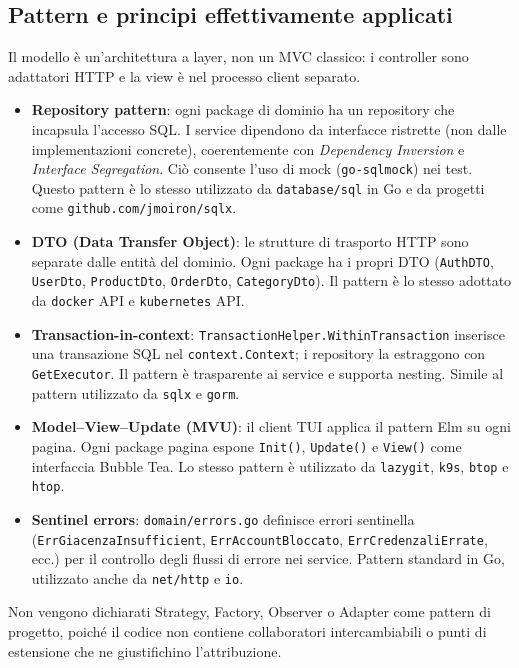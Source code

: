 \documentclass[a4paper,12pt]{article}
\begin{document}
\subsection{Pattern e principi effettivamente applicati}

Il modello è un'architettura a layer, non un MVC classico: i controller sono adattatori HTTP e la view è nel processo client separato.

\begin{itemize}
    \item \textbf{Repository pattern}: ogni package di dominio ha un repository che incapsula l'accesso SQL. I service dipendono da interfacce ristrette (non dalle implementazioni concrete), coerentemente con \emph{Dependency Inversion} e \emph{Interface Segregation}. Ciò consente l'uso di mock (\texttt{go-sqlmock}) nei test. Questo pattern è lo stesso utilizzato da \texttt{database/sql} in Go e da progetti come \texttt{github.com/jmoiron/sqlx}.
    \item \textbf{DTO (Data Transfer Object)}: le strutture di trasporto HTTP sono separate dalle entità del dominio. Ogni package ha i propri DTO (\texttt{AuthDTO}, \texttt{UserDto}, \texttt{ProductDto}, \texttt{OrderDto}, \texttt{CategoryDto}). Il pattern è lo stesso adottato da \texttt{docker} API e \texttt{kubernetes} API.
    \item \textbf{Transaction-in-context}: \texttt{TransactionHelper.WithinTransaction} inserisce una transazione SQL nel \texttt{context.Context}; i repository la estraggono con \texttt{GetExecutor}. Il pattern è trasparente ai service e supporta nesting. Simile al pattern utilizzato da \texttt{sqlx} e \texttt{gorm}.
    \item \textbf{Model--View--Update (MVU)}: il client TUI applica il pattern Elm su ogni pagina. Ogni package pagina espone \texttt{Init()}, \texttt{Update()} e \texttt{View()} come interfaccia Bubble Tea. Lo stesso pattern è utilizzato da \texttt{lazygit}, \texttt{k9s}, \texttt{btop} e \texttt{htop}.
    \item \textbf{Sentinel errors}: \texttt{domain/errors.go} definisce errori sentinella (\texttt{ErrGiacenzaInsufficient}, \texttt{ErrAccountBloccato}, \texttt{ErrCredenzaliErrate}, ecc.) per il controllo degli flussi di errore nei service. Pattern standard in Go, utilizzato anche da \texttt{net/http} e \texttt{io}.
\end{itemize}

Non vengono dichiarati Strategy, Factory, Observer o Adapter come pattern di progetto, poiché il codice non contiene collaboratori intercambiabili o punti di estensione che ne giustifichino l'attribuzione.
\end{document}
